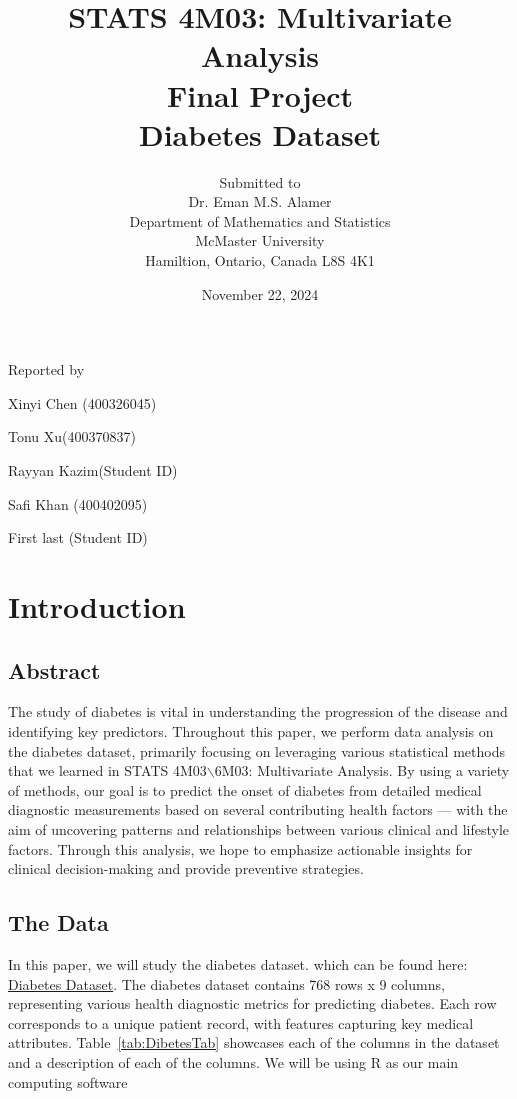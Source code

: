 \documentclass[12pt]{article}
\begin{document}
\title{STATS 4M03: Multivariate Analysis\\ Final Project \\ Diabetes Dataset }

\author{Submitted to\\ Dr. Eman M.S. Alamer 
\\Department of Mathematics and Statistics
\\McMaster University\\Hamiltion, Ontario, Canada L8S 4K1}
\date {November 22, 2024}


\maketitle

 \centerline{Reported by}
 \centerline{Xinyi Chen (400326045)}
  \centerline{Tonu Xu(400370837)}
   \centerline{Rayyan Kazim(Student ID)}
    \centerline{Safi Khan (400402095)}
     \centerline{First last (Student ID)}


\newpage
\section{Introduction}
\subsection{Abstract}

The study of diabetes is vital in understanding the progression of the disease and identifying key predictors. Throughout this paper, we perform data analysis on the diabetes dataset, primarily focusing on leveraging various statistical methods that we learned in STATS 4M03$\backslash$6M03: Multivariate Analysis. By using a variety of methods, our goal is to predict the onset of diabetes from detailed medical diagnostic measurements based on several contributing health factors --- with the aim of uncovering patterns and relationships between various clinical and lifestyle factors. Through this analysis, we hope to emphasize actionable insights for clinical decision-making and provide preventive strategies. 

\subsection{The Data}

In this paper, we will study the diabetes dataset. \cite{Kaggles} which can be found here: \href{https://www.kaggle.com/datasets/hasibur013/diabetes-dataset}{Diabetes Dataset}. The diabetes dataset contains 768 rows x 9 columns, representing various health diagnostic metrics for predicting diabetes. Each row corresponds to a unique patient record, with features capturing key medical attributes. Table~\ref{tab:DibetesTab} showcases each of the columns in the dataset and a description of each of the columns. We will be using R \cite{Rlang} as our main computing software
\end{document}
